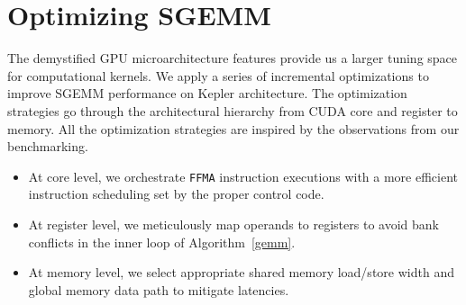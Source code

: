 \section{Optimizing SGEMM}
\label{sec:optimization}


The demystified GPU microarchitecture features provide us a larger tuning space for computational kernels.
We apply
a series of incremental optimizations to improve SGEMM performance on Kepler architecture. The optimization strategies
go through the architectural hierarchy from CUDA core and register to memory. All the optimization strategies are
inspired by the observations from our benchmarking.
\begin{itemize}
\item At core level, we orchestrate {\tt FFMA} instruction executions with a more efficient instruction scheduling set by the proper control code.
\item At register level, we meticulously map operands to registers to avoid bank conflicts in the inner loop of Algorithm~\ref{gemm}.
\item At memory level, we select appropriate shared memory load/store width and global memory data path to mitigate
latencies.
\end{itemize}




